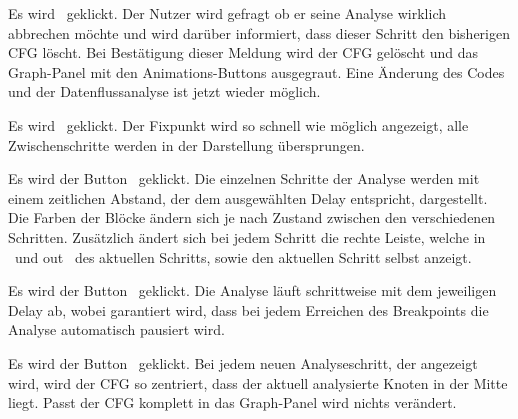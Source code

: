 

{Es wird \faStop\ geklickt.}
{Der Nutzer wird gefragt ob er seine Analyse wirklich abbrechen möchte und wird darüber informiert, dass dieser Schritt den bisherigen CFG löscht. Bei Bestätigung dieser Meldung wird der CFG gelöscht und das Graph-Panel mit den Animations-Buttons ausgegraut. Eine Änderung des Codes und der Datenflussanalyse ist jetzt wieder möglich.}



{Es wird \faPlay\ geklickt.}
{Der Fixpunkt wird so schnell wie möglich angezeigt, alle Zwischenschritte werden in der Darstellung übersprungen.}

{Es wird der Button \faPlay\ geklickt.}
{Die einzelnen Schritte der Analyse werden mit einem zeitlichen Abstand, der dem ausgewählten Delay entspricht, dargestellt. Die Farben der Blöcke ändern sich je nach Zustand zwischen den verschiedenen Schritten. Zusätzlich ändert sich bei jedem Schritt die rechte Leiste, welche \glqq in \grqq\ und \glqq out \grqq\ des aktuellen Schritts, sowie den aktuellen Schritt selbst anzeigt.}

{Es wird der Button \faPlay\ geklickt.}
{Die Analyse läuft schrittweise mit dem jeweiligen Delay ab, wobei garantiert wird, dass bei jedem Erreichen des Breakpoints die Analyse automatisch pausiert wird.}

{Es wird der Button \faPlay\ geklickt.}
{Bei jedem neuen Analyseschritt, der angezeigt wird, wird der CFG so zentriert, dass der aktuell analysierte Knoten in der Mitte liegt. Passt der CFG komplett in das Graph-Panel wird nichts verändert.}




